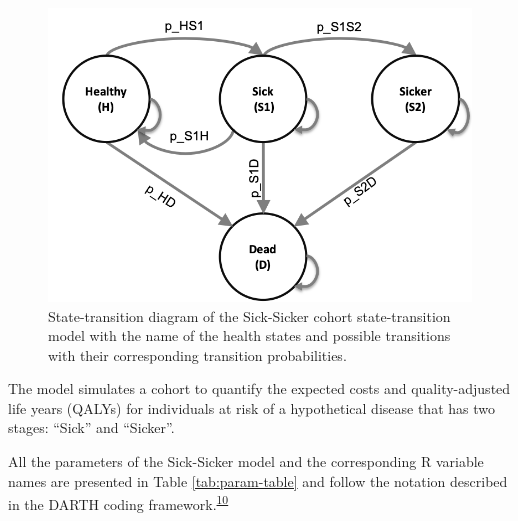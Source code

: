 \documentclass[
]{article}
\begin{document}
\begin{figure}[H]

{\centering \includegraphics[width=10.64in]{figs/Sick-Sicker} 

}

\caption{State-transition diagram of the Sick-Sicker cohort state-transition model with the name of the health states and possible transitions with their corresponding transition probabilities.}\label{fig:STD-Sick-Sicker}
\end{figure}

The model simulates a cohort to quantify the expected costs and quality-adjusted life years (QALYs) for individuals at risk of a hypothetical disease that has two stages: ``Sick'' and ``Sicker''.

All the parameters of the Sick-Sicker model and the corresponding R variable names are presented in Table \ref{tab:param-table} and follow the notation described in the DARTH coding framework.\textsuperscript{\protect\hyperlink{ref-Alarid-Escudero2019e}{10}}
\end{document}
